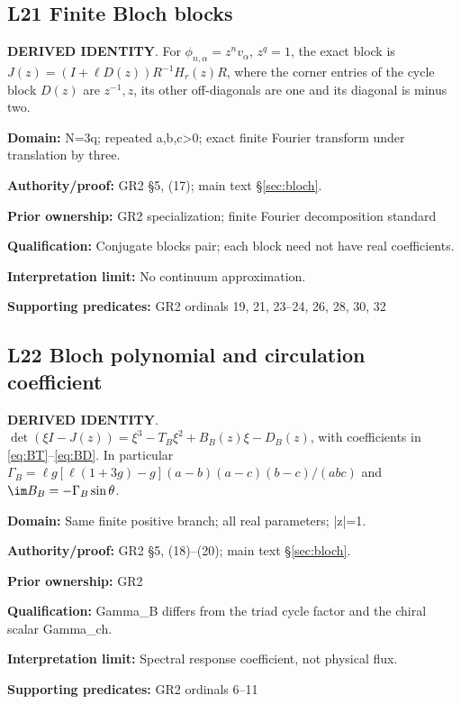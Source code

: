 \par\noindent\begin{minipage}{\linewidth}
\subsection*{L21 Finite Bloch blocks}
\textbf{DERIVED IDENTITY}. For \(\phi_{n,\alpha}=z^nv_\alpha\), \(z^q=1\), the exact block is \(J(z)=(I+\ell D(z))R^{-1}H_r(z)R\), where the corner entries of the cycle block \(D(z)\) are \(z^{-1},z\), its other off-diagonals are one and its diagonal is minus two.\par
\textbf{Domain:} N=3q; repeated a,b,c>0; exact finite Fourier transform under translation by three.\par
\textbf{Authority/proof:} GR2 \S{}5, (17); main text \S\ref{sec:bloch}.\par
\textbf{Prior ownership:} GR2 specialization; finite Fourier decomposition standard\par
\textbf{Qualification:} Conjugate blocks pair; each block need not have real coefficients.\par
\textbf{Interpretation limit:} No continuum approximation.\par
\textbf{Supporting predicates:} GR2 ordinals 19, 21, 23--24, 26, 28, 30, 32\par
\end{minipage}\par\medskip
\par\noindent\begin{minipage}{\linewidth}
\subsection*{L22 Bloch polynomial and circulation coefficient}
\textbf{DERIVED IDENTITY}. \(\det(\xi I-J(z))=\xi^3-T_B\xi^2+B_B(z)\xi-D_B(z)\), with coefficients in \eqref{eq:BT}--\eqref{eq:BD}. In particular \(\Gamma_B=\ell g[\ell(1+3g)-g](a-b)(a-c)(b-c)/(abc)\) and \(\im B_B=-\Gamma_B\sin\theta\).\par
\textbf{Domain:} Same finite positive branch; all real parameters; |z|=1.\par
\textbf{Authority/proof:} GR2 \S{}5, (18)--(20); main text \S\ref{sec:bloch}.\par
\textbf{Prior ownership:} GR2\par
\textbf{Qualification:} Gamma\_B differs from the triad cycle factor and the chiral scalar Gamma\_ch.\par
\textbf{Interpretation limit:} Spectral response coefficient, not physical flux.\par
\textbf{Supporting predicates:} GR2 ordinals 6--11\par
\end{minipage}\par\medskip
